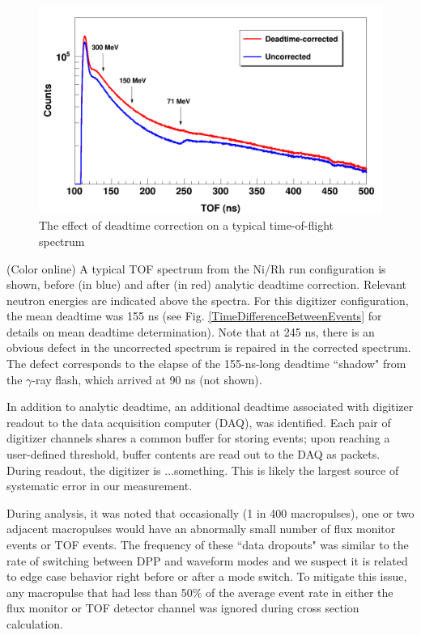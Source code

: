 \begin{figure}
    \includegraphics[scale=0.3]{figures/CorrectionEffectOnTOF.png}
    \caption{The effect of deadtime correction on a typical time-of-flight spectrum}
    \label{CorrectionEffectOnTOF}
\end{figure}

(Color online) A typical TOF spectrum from the Ni/Rh
        run configuration is shown, before (in blue) and after (in red) analytic
        deadtime correction. Relevant neutron energies are indicated above the spectra.
        For this digitizer configuration, the mean deadtime was 155 ns (see Fig.
        \ref{TimeDifferenceBetweenEvents} for details on mean deadtime determination).
        Note that at 245 ns, there is an
        obvious defect in the uncorrected spectrum is repaired in the corrected
        spectrum. The defect
        corresponds to the elapse of the 155-ns-long deadtime ``shadow" from the $\gamma$-ray
        flash, which arrived at 90 ns (not shown).

In addition to analytic deadtime, an additional deadtime associated with digitizer readout 
to the data acquisition computer (DAQ), was identified. Each pair of
digitizer channels shares a common buffer for storing events; upon reaching a
user-defined threshold, buffer contents are read out to the DAQ as packets.
During readout, the digitizer is ...something.
This is likely the largest source of systematic error in our measurement.

During analysis, it was noted that occasionally (1 in 400 macropulses), one or two 
adjacent macropulses would have an abnormally small number of flux monitor events or 
TOF events. The frequency of these ``data dropouts" was similar to the rate of
switching between DPP and waveform modes and we suspect it is related to edge
case behavior right before or after a mode switch. To mitigate this issue,
any macropulse that had less than 50\% of the average event rate in either the
flux monitor or TOF detector channel was ignored during cross section calculation.

